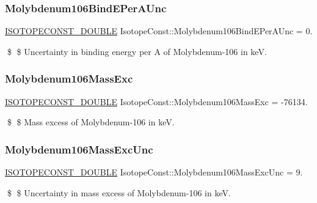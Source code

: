 \subsubsection{\texorpdfstring{Molybdenum106\+Bind\+E\+Per\+A\+Unc}{Molybdenum106BindEPerAUnc}}
{\footnotesize\ttfamily \mbox{\hyperlink{group___isotope_const-_macros_ga8f45a7272ce02c0b4c65c44636ed719a}{I\+S\+O\+T\+O\+P\+E\+C\+O\+N\+S\+T\+\_\+\+D\+O\+U\+B\+LE}} Isotope\+Const\+::\+Molybdenum106\+Bind\+E\+Per\+A\+Unc = 0.}

\$ \$ Uncertainty in binding energy per A of Molybdenum-\/106 in keV. \mbox{\label{group___isotope_const-_molybdenum-_mo106_ga5e03932842d80d010b9fc00aae5c9662}} 
\subsubsection{\texorpdfstring{Molybdenum106\+Mass\+Exc}{Molybdenum106MassExc}}
{\footnotesize\ttfamily \mbox{\hyperlink{group___isotope_const-_macros_ga8f45a7272ce02c0b4c65c44636ed719a}{I\+S\+O\+T\+O\+P\+E\+C\+O\+N\+S\+T\+\_\+\+D\+O\+U\+B\+LE}} Isotope\+Const\+::\+Molybdenum106\+Mass\+Exc = -\/76134.}

\$ \$ Mass excess of Molybdenum-\/106 in keV. \mbox{\label{group___isotope_const-_molybdenum-_mo106_ga4927a052473e2c383dc335664b449351}} 
\subsubsection{\texorpdfstring{Molybdenum106\+Mass\+Exc\+Unc}{Molybdenum106MassExcUnc}}
{\footnotesize\ttfamily \mbox{\hyperlink{group___isotope_const-_macros_ga8f45a7272ce02c0b4c65c44636ed719a}{I\+S\+O\+T\+O\+P\+E\+C\+O\+N\+S\+T\+\_\+\+D\+O\+U\+B\+LE}} Isotope\+Const\+::\+Molybdenum106\+Mass\+Exc\+Unc = 9.}

\$ \$ Uncertainty in mass excess of Molybdenum-\/106 in keV. \mbox{\label{group___isotope_const-_molybdenum-_mo106_gaf95ac21e07743982f8dc5e63daadfac1}} 
